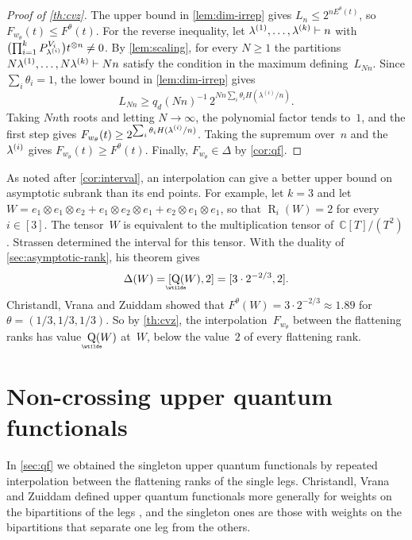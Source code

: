 \documentclass[11pt,letterpaper]{article}
\DeclareMathOperator{\asympsubrank}{\underaccent{\wtilde}{Q}}
\DeclareMathOperator{\tensorrank}{R}
\newcommand{\CC}{\mathbb{C}}
\begin{document}
\begin{proof}[Proof of \cref{th:cvz}]
The upper bound in \cref{lem:dim-irrep} gives $L_n \leq 2^{n E^\theta(t)}$, so $F_{w_\theta}(t) \leq F^\theta(t)$. For the reverse inequality, let $\lambda^{\smash{(1)}}, \ldots, \lambda^{\smash{(k)}} \vdash n$ with $\bigl(\prod_{i=1}^{\smash[t]{k}} P^{V_i}_{\lambda^{\smash{(i)}}}\bigr) t^{\otimes n} \neq 0$. By \cref{lem:scaling}, for every $N \geq 1$ the partitions $N\lambda^{\smash{(1)}}, \ldots, N\lambda^{\smash{(k)}} \vdash Nn$ satisfy the condition in the maximum defining~$L_{Nn}$. Since $\sum_i \theta_i = 1$, the lower bound in \cref{lem:dim-irrep} gives
\[
L_{Nn} \geq q_d(Nn)^{-1}\, 2^{Nn \sum_i \theta_i H(\lambda^{(i)}/n)}.
\]
Taking $Nn$th roots and letting $N \to \infty$, the polynomial factor tends to~$1$, and the first step gives $F_{w_\theta}(t) \geq 2^{\sum_i \theta_i H(\lambda^{\smash{(i)}}/n)}$. Taking the supremum over~$n$ and the~$\lambda^{\smash{(i)}}$ gives $F_{w_\theta}(t) \geq F^\theta(t)$. Finally, $F_{w_\theta} \in \Delta$ by \cref{cor:qf}.
\end{proof}

As noted after \cref{cor:interval}, an interpolation can give a better upper bound on asymptotic subrank than its end points. For example, let $k = 3$ and let $W = e_1 \otimes e_1 \otimes e_2 + e_1 \otimes e_2 \otimes e_1 + e_2 \otimes e_1 \otimes e_1$, so that $\tensorrank_i(W) = 2$ for every $i \in [3]$. The tensor~$W$ is equivalent to the multiplication tensor of~$\CC[T]/(T^2)$. Strassen \cite[Theorem~6.7]{strassen1991degeneration} determined the interval for this tensor. With the duality of \cref{sec:asymptotic-rank}, his theorem gives
\[
\Delta(W) = [\asympsubrank(W), 2] = [3 \cdot 2^{-2/3}, 2].
\]
Christandl, Vrana and Zuiddam \cite[Example~4.8]{MR4495838} showed that $F^\theta(W) = 3 \cdot 2^{-2/3} \approx 1.89$ for $\theta = (1/3, 1/3, 1/3)$. So by \cref{th:cvz}, the interpolation~$F_{w_\theta}$ between the flattening ranks has value~$\asympsubrank(W)$ at~$W$, below the value~$2$ of every flattening rank.

\section{Non-crossing upper quantum functionals}\label{sec:upper}

In \cref{sec:qf} we obtained the singleton upper quantum functionals by repeated interpolation between the flattening ranks of the single legs. Christandl, Vrana and Zuiddam defined upper quantum functionals more generally for weights on the bipartitions of the legs \cite[Definition~3.14]{MR4495838}, and the singleton ones are those with weights on the bipartitions that separate one leg from the others. 
\end{document}
